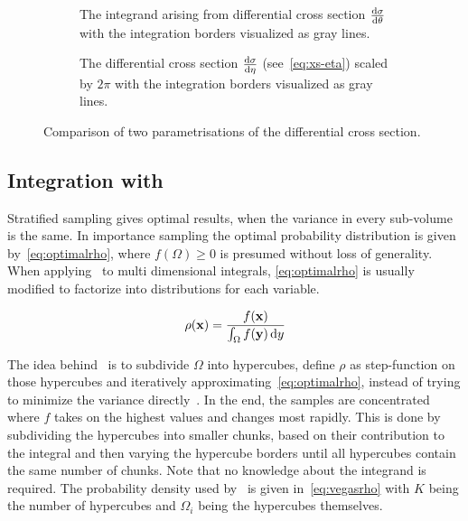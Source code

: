 \begin{figure}[ht]
  \centering
  \begin{subfigure}[c]{.49\textwidth}
    \caption[\(2\pi\dv{\sigma}{\theta}\) with integration
    boundaries]{\label{fig:xs-int-theta} The integrand arising from
      differential cross section \(\dv{\sigma}{\theta}\) with the
      integration borders visualized as gray lines.}
  \end{subfigure}
  \begin{subfigure}[c]{.49\textwidth}
    \caption[Differential cross section for \(\qqgg\) with integration
    boundaries]{\label{fig:xs-int-eta} The differential cross section
      \(\dv{\sigma}{\eta}\) (see~\ref{eq:xs-eta}) scaled by \(2\pi\)
      with the integration borders visualized as gray lines.}
  \end{subfigure}
  \caption{\label{fig:xs-int-comp} Comparison of two parametrisations
    of the differential cross section.}
\end{figure}

\subsection{Integration with \vegas}
\label{sec:mcintvegas}

Stratified sampling gives optimal results, when the variance in every
sub-volume is the same\cite{Lepage:19781an}. In importance sampling
the optimal probability distribution is given
by~\eqref{eq:optimalrho}, where \(f(\Omega) \geq 0\) is presumed
without loss of generality. When applying \vegas\ to multi dimensional
integrals, \ref{eq:optimalrho} is usually modified to factorize into
distributions for each variable.

\begin{equation}
  \label{eq:optimalrho}
  \rho(\vb{x}) = \frac{f(\vb{x})}{\int_\Omega f(\vb{y})\dd{y}}
\end{equation}

The idea behind \vegas\ is to subdivide \(\Omega\) into hypercubes,
define \(\rho\) as step-function on those hypercubes and iteratively
approximating~\eqref{eq:optimalrho}, instead of trying to minimize the
variance directly~\cite{Lepage:19781an}. In the end, the samples are
concentrated where \(f\) takes on the highest values and changes most
rapidly. This is done by subdividing the hypercubes into smaller
chunks, based on their contribution to the integral and then varying
the hypercube borders until all hypercubes contain the same number of
chunks. Note that no knowledge about the integrand is required. The
probability density used by \vegas\ is given in~\eqref{eq:vegasrho}
with \(K\) being the number of hypercubes and \(\Omega_i\) being the
hypercubes themselves.

